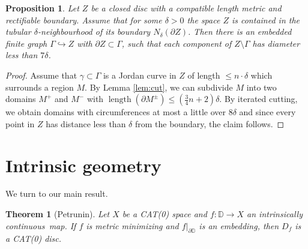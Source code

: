 \documentclass[a4paper,12pt]{article}
\newtheorem{theorem}{Theorem}
\newtheorem{proposition}{Proposition}
\theoremstyle{remark}\newtheorem*{remark}{Remark}
\theoremstyle{definition}\newtheorem{definition}{Definition}
\newcommand{\DD}{\mathbb D}
\newcommand{\len}{\operatorname{length}}
\newcommand{\ic}{intrinsically continuous}
\begin{document}
\begin{proposition}\label{prop:app2}
 Let $Z$ be a closed disc with a compatible length metric and rectifiable boundary.
 Assume that for some $\delta>0$ the space $Z$ is contained in the tubular $\delta$-neighbourhood
 of its boundary $N_\delta(\partial Z)$. Then there is an embedded 
 finite graph $\Gamma\hookrightarrow Z$ with $\partial Z\subset \Gamma$, such that each component
 of $Z\setminus \Gamma$ has diameter less than $7\delta$.
\end{proposition}


\begin{proof}
 Assume that $\gamma\subset\Gamma$ is a Jordan curve in $Z$ of length $\leq n\cdot\delta$ which 
 surrounds a region $M$.
 By Lemma \ref{lem:cut}, we can subdivide $M$ into two domains $M^+$ and $M^-$ with 
 $\len(\partial M^\pm)\leq (\frac{3}{4}n+2)\delta$. By iterated cutting, we obtain 
 domains with circumferences at most a little over $8\delta$ and since every point
 in $Z$
 has distance less than $\delta$ from the boundary, the claim follows.
\end{proof}




\section{Intrinsic geometry}

We turn to our main result.


\begin{theorem}[Petrunin]
Let $X$ be a CAT(0) space and $f:\DD\rightarrow X$ an \ic\ map. If $f$ is metric minimizing and 
$f|_{\partial \DD}$ is an embedding, then $D_f$ is a CAT(0) disc.
\end{theorem}
\end{document}
